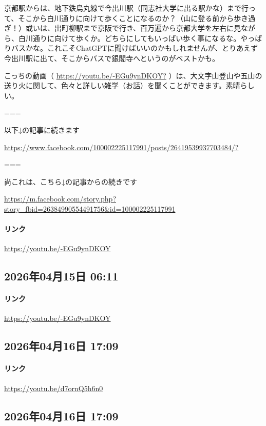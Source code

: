 京都駅からは、地下鉄烏丸線で今出川駅（同志社大学に出る駅かな）まで行って、そこから白川通りに向けて歩くことになるのか？（山に登る前から歩き過ぎ！）或いは、出町柳駅まで京阪で行き、百万遍から京都大学を左右に見ながら、白川通りに向けて歩くか。どちらにしてもいっぱい歩く事になるな。やっぱりバスかな。これこそChatGPTに聞けばいいのかもしれませんが、とりあえず今出川駅に出て、そこからバスで銀閣寺へというのがベストかも。

こっちの動画（ \url{https://youtu.be/-EGu9ynDKOY?} ）は、大文字山登山や五山の送り火に関して、色々と詳しい雑学（お話）を聞くことができます。素晴らしい。

===

以下↓の記事に続きます

\url{https://www.facebook.com/100002225117991/posts/26419539937703484/?}

===

尚これは、こちら↓の記事からの続きです

\url{https://m.facebook.com/story.php?story_fbid=26384990554491756&id=100002225117991}

\paragraph{リンク}
\url{https://youtu.be/-EGu9ynDKOY}

\subsection*{2026年04月15日 06:11}

\paragraph{リンク}
\url{https://youtu.be/-EGu9ynDKOY}

\subsection*{2026年04月16日 17:09}

\paragraph{リンク}
\url{https://youtu.be/d7ornQ5h6n0}

\subsection*{2026年04月16日 17:09}

